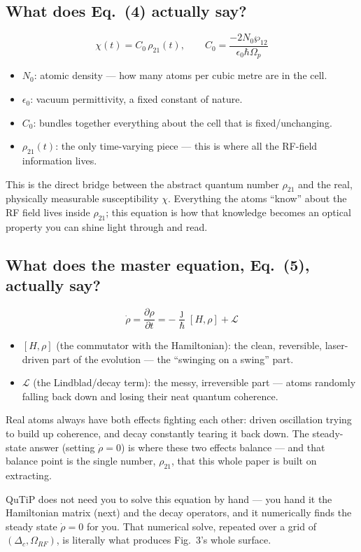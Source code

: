\documentclass[11pt]{article}
\begin{document}
\subsection*{What does Eq.~(4) actually say?}
\[
\chi(t) = C_0\,\rho_{21}(t), \qquad C_0 = \frac{-2N_0\wp_{12}}{\epsilon_0\hbar\Omega_p}
\]
\begin{itemize}
\item $N_0$: atomic density --- how many atoms per cubic metre are in the cell.
\item $\epsilon_0$: vacuum permittivity, a fixed constant of nature.
\item $C_0$: bundles together everything about the cell that is fixed/unchanging.
\item $\rho_{21}(t)$: the only time-varying piece --- this is where all the RF-field information lives.
\end{itemize}
\begin{eqmeaning}
This is the direct bridge between the abstract quantum number $\rho_{21}$ and the real, physically measurable susceptibility $\chi$. Everything the atoms ``know'' about the RF field lives inside $\rho_{21}$; this equation is how that knowledge becomes an optical property you can shine light through and read.
\end{eqmeaning}

\subsection*{What does the master equation, Eq.~(5), actually say?}
\[
\dot\rho = \frac{\partial\rho}{\partial t} = -\frac{\jmath}{\hbar}[H,\rho] + \mathcal{L}
\]
\begin{itemize}
\item $[H,\rho]$ (the commutator with the Hamiltonian): the clean, reversible, laser-driven part of the evolution --- the ``swinging on a swing'' part.
\item $\mathcal{L}$ (the Lindblad/decay term): the messy, irreversible part --- atoms randomly falling back down and losing their neat quantum coherence.
\end{itemize}
\begin{eqmeaning}
Real atoms always have both effects fighting each other: driven oscillation trying to build up coherence, and decay constantly tearing it back down. The steady-state answer (setting $\dot\rho=0$) is where these two effects balance --- and that balance point is the single number, $\rho_{21}$, that this whole paper is built on extracting.
\end{eqmeaning}
\begin{simuse}
QuTiP does not need you to solve this equation by hand --- you hand it the Hamiltonian matrix (next) and the decay operators, and it numerically finds the steady state $\dot\rho=0$ for you. That numerical solve, repeated over a grid of $(\Delta_c,\Omega_{RF})$, is literally what produces Fig.~3's whole surface.
\end{simuse}
\end{document}
